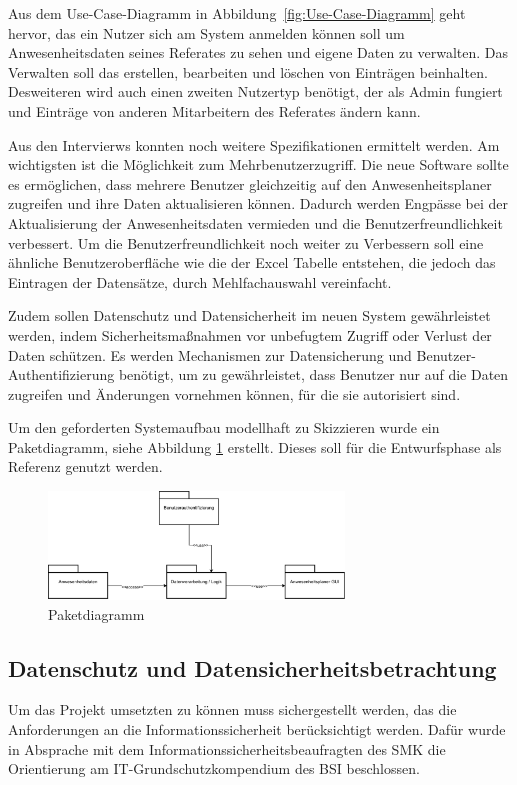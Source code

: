 Aus dem Use-Case-Diagramm in Abbildung~\ref{fig:Use-Case-Diagramm} geht hervor, das ein Nutzer sich am System anmelden können soll um Anwesenheitsdaten seines Referates zu sehen und eigene Daten zu verwalten. Das Verwalten soll das erstellen, bearbeiten und löschen von Einträgen beinhalten. Desweiteren wird auch einen zweiten Nutzertyp benötigt, der als Admin fungiert und Einträge von anderen Mitarbeitern des Referates ändern kann.

Aus den Intervierws konnten noch weitere Spezifikationen ermittelt werden. Am wichtigsten ist die Möglichkeit zum Mehrbenutzerzugriff. Die neue Software sollte es ermöglichen, dass mehrere Benutzer gleichzeitig auf den Anwesenheitsplaner zugreifen und ihre Daten aktualisieren können. Dadurch werden Engpässe bei der Aktualisierung der Anwesenheitsdaten vermieden und die Benutzerfreundlichkeit verbessert. Um die Benutzerfreundlichkeit noch weiter zu Verbessern soll eine ähnliche Benutzeroberfläche wie die der Excel Tabelle entstehen, die jedoch das Eintragen der Datensätze, durch \zB Mehlfachauswahl vereinfacht.

Zudem sollen Datenschutz und Datensicherheit im neuen System gewährleistet werden, indem Sicherheitsmaßnahmen vor unbefugtem Zugriff oder Verlust der Daten schützen. Es werden Mechanismen zur Datensicherung und Benutzer-Authentifizierung benötigt, um zu gewährleistet, dass Benutzer nur auf die Daten zugreifen und Änderungen vornehmen können, für die sie autorisiert sind.

Um den geforderten Systemaufbau modellhaft zu Skizzieren wurde ein Paketdiagramm, siehe Abbildung \ref{abb:Paketdiagramm} erstellt. Dieses soll für die Entwurfsphase als Referenz genutzt werden.

\begin{figure}[htbp]
    \centering
    \includegraphics[width=0.7\textwidth,angle=0]{abb/Paketdiagramm.pdf}
    \caption[Beschreibung]{Paketdiagramm}
    \label{abb:Paketdiagramm}
\end{figure}

\subsection{Datenschutz und Datensicherheitsbetrachtung}
\label{sec:Datenschutz}
Um das Projekt umsetzten zu können muss sichergestellt werden, das die Anforderungen an die Informationssicherheit berücksichtigt werden. Dafür wurde in Absprache mit dem Informationssicherheitsbeaufragten des SMK die Orientierung am IT-Grundschutzkompendium des BSI beschlossen. 

